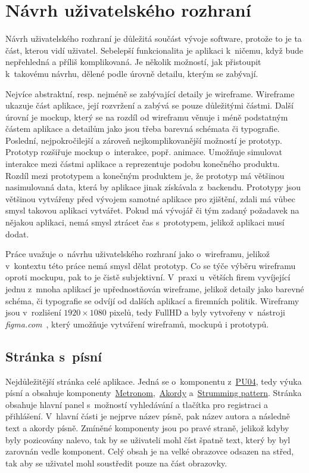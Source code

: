 \section{Návrh uživatelského rozhraní}
\label{sc:wireframes}
Návrh uživatelského rozhraní je důležitá součást vývoje software, protože to je ta část, kterou vidí uživatel. Sebelepší funkcionalita je aplikaci k~ničemu, když bude nepřehledná a příliš komplikovaná. Je několik možností, jak přistoupit k~takovému návrhu, dělené podle úrovně detailu, kterým se zabývají.

Nejvíce abstraktní, resp. nejméně se zabývající detaily je wireframe. Wireframe ukazuje část aplikace, její rozvržení a zabývá se pouze důležitými částmi. Další úrovní je mockup, který se na rozdíl od wireframu věnuje i méně podstatným částem aplikace a detailům jako jsou třeba barevná schémata či typografie. Poslední, nejpokročilejší a zároveň nejkomplikovanější možností je prototyp. Prototyp rozšiřuje mockup o~interakce, popř. animace. Umožňuje simulovat interakce mezi částmi aplikace a reprezentuje podobu konečného produktu. Rozdíl mezi prototypem a konečným produktem je, že prototyp má většinou nasimulovaná data, která by aplikace jinak získávala z~backendu. Prototypy jsou většinou vytvářeny před vývojem samotné aplikace pro zjištění, zdali má vůbec smysl takovou aplikaci vytvářet. Pokud má vývojář či tým zadaný požadavek na nějakou aplikaci, nemá smysl ztrácet čas s~prototypem, jelikož aplikaci musí dodat.

Práce uvažuje o~návrhu uživatelského rozhraní jako o~wireframu, jelikož v~kontextu této práce nemá smysl dělat prototyp. Co se týče výběru wireframu oproti mockupu, pak to je čistě subjektivní. V~praxi u~větších firem vyvíjející jednu z~mnoha aplikací je upřednostňován wireframe, jelikož detaily jako barevné schéma, či typografie se odvíjí od dalších aplikací a firemních politik. Wireframy jsou v~rozlišení $1920 \times 1080$ pixelů, tedy FullHD a byly vytvořeny v~nástroji \emph{figma.com}~\cite{figmainc_2019_figma}, který umožňuje vytváření wireframů, mockupů i prototypů.

\subsection{Stránka s~písní}
\label{ss:wireframe_song}
Nejdůležitější stránka celé aplikace. Jedná se o~komponentu z~\hyperref[uc04]{PU04}, tedy výuka písní a obsahuje komponenty~\hyperref[uc01]{Metronom},~\hyperref[uc02]{Akordy} a~\hyperref[uc03]{Strumming pattern}. Stránka obsahuje hlavní panel s~možností vyhledávání a tlačítka pro registraci a přihlášení. V~hlavní části je nejprve název písně, pak název autora a následně text a akordy písně. Zmíněné komponenty jsou po pravé straně, jelikož kdyby byly pozicovány nalevo, tak by se uživateli mohl číst špatně text, který by byl zarovnán vedle komponent. Celý obsah je na velké obrazovce odsazen na střed, tak aby se uživatel mohl soustředit pouze na část obrazovky.

